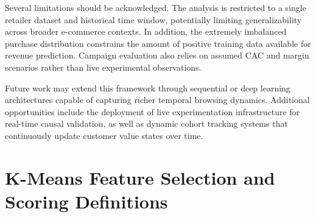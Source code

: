 \documentclass[conference]{IEEEtran}
\begin{document}
Several limitations should be acknowledged. The analysis is
restricted to a single retailer dataset and historical time
window, potentially limiting generalizability across broader
e-commerce contexts. In addition, the extremely imbalanced
purchase distribution constrains the amount of positive
training data available for revenue prediction. Campaign
evaluation also relies on assumed CAC and margin scenarios
rather than live experimental observations.

Future work may extend this framework through sequential or
deep learning architectures capable of capturing richer
temporal browsing dynamics. Additional opportunities include
the deployment of live experimentation infrastructure for
real-time causal validation, as well as dynamic cohort
tracking systems that continuously update customer value
states over time.
\onecolumn
\appendices

\appendices 

\section{K-Means Feature Selection and Scoring Definitions}
\label{app:kmeans_features}
\end{document}
